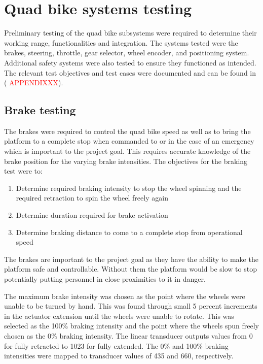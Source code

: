 \documentclass[main.tex]{subfiles}
\begin{document}
\section{Quad bike systems testing}
Preliminary testing of the quad bike subsystems were required to determine their working range, functionalities and integration. The systems tested were the brakes, steering, throttle, gear selector, wheel encoder, and positioning system. Additional safety systems were also tested to ensure they functioned as intended.
The relevant test objectives and test cases were documented and can be found in (\textcolor{red}{ APPENDIXXX}).

\subsection{Brake testing}
The brakes were required to control the quad bike speed as well as to bring the platform to a complete stop when commanded to or in the case of an emergency which is important to the project goal. This requires accurate knowledge of the brake position for the varying brake intensities. The objectives for the braking test were to:

\begin{enumerate}
\item Determine required braking intensity to stop the wheel spinning and the required retraction to spin the wheel freely again
\item Determine duration required for brake activation
\item Determine braking distance to come to a complete stop from operational speed  
\end{enumerate}

The brakes are important to the project goal as they have the ability to make the platform safe and controllable. Without them the platform would be slow to stop potentially putting personnel in close proximities to it in danger.

The maximum brake intensity was chosen as the point where the wheels were unable to be turned by hand. This was found through small 5 percent increments in the actuator extension until the wheels were unable to rotate. This was selected as the 100\% braking intensity and the point where the wheels spun freely chosen as the 0\% braking intensity. The linear transducer outputs values from 0 for fully retracted to 1023 for fully extended. The 0\% and 100\% braking intensities were mapped to transducer values of 435 and 660, respectively.
\end{document}
